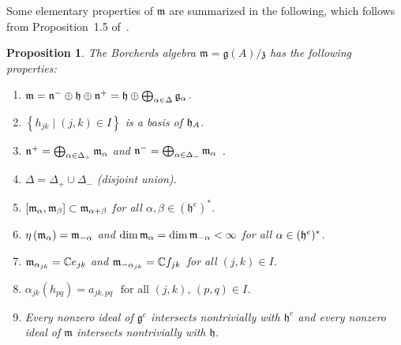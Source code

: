 \documentclass[11pt,letterpaper]{amsart}
\newcounter{thecounter}
\numberwithin{thecounter}{section}
\newtheorem{proposition}[thecounter]{Proposition}
\theoremstyle{definition}
\renewcommand{\a}{\alpha}
\renewcommand{\b}{\beta}
\newcommand{\C}{{\mathbb C}}
\begin{document}
Some elementary properties of $\mathfrak{m}$ are summarized 
in the following, which follows from Proposition~1.5 of~\cite{jurisich1996exposition}. 
\begin{proposition} \label{P-all}
The Borcherds algebra $\mathfrak{m}=\mathfrak{g}(A)/\mathfrak{z}$ has the following properties:
\begin{enumerate}
\item $\mathfrak{m}= \frak n^{-} \oplus \frak h \oplus \frak n^{+}= \frak h \oplus \bigoplus_{\alpha\in \Delta}\frak g_{\alpha}$.
\item  $\left\{h_{jk}\mid (j,k)\in I \right\}$ is a basis of ${\frak h_A}$.
\item $\frak n^+ = \bigoplus_{\a \in \Delta_+} \frak m_\a$
   and $\frak n^-  = \bigoplus_{\a \in \Delta_-} \frak m_\a$ .%
\item $\Delta = \Delta_+ \cup \Delta_-$ (disjoint union).
\item $\left[\frak m_\a, \frak m_\b \right] \subset \frak m_{\a+\b}$ for all $\a,\b \in \left(\mathfrak{h}^e \right)^*$.
\item $\eta \left(\frak m_\a \right) = \frak m_{- \a}$ and $\dim \frak m_\a = \dim \frak m_{-\a} < \infty$ for all $\a \in (\frak h^e)^*$.
\item $\frak m_{\alpha_{jk}} = \C e_{jk}$  and $\frak m_{-\alpha_{jk}} = \C f_{jk}\,$ for all  $(j,k) \in I$.
\item $\alpha_{jk} \left(h_{pq} \right) =  a_{jk,pq}$ $\text{ for all } (j,k),\,(p,q) \in I$.
\item Every nonzero ideal of $\mathfrak{g}^e$ intersects nontrivially with $\mathfrak{h}^e$  and every nonzero ideal of $\mathfrak{m}$ intersects nontrivially with $\mathfrak{h}$.
\end{enumerate}
\end{proposition}
\end{document}
